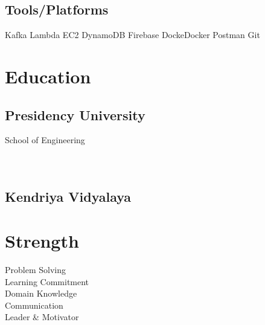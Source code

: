 \documentclass[]{BismayResume}
\begin{document}
\begin{minipage}[t]{0.25\textwidth}
\subsection{Tools/Platforms}
\sectionsep
Kafka \textbullet{}  \textbullet{} Lambda \textbullet{} EC2 \textbullet{}DynamoDB \textbullet{} Firebase \textbullet{} DockeDocker \textbullet{}Postman \textbullet{}Git \\

\sectionsep


\section{Education} 
\subsection{Presidency University}
School of Engineering \\ 

\sectionsep
\\
\\
\subsection{Kendriya Vidyalaya}
\sectionsep


\section{Strength} 

\textbullet{} Problem Solving  \\ \textbullet{} Learning Commitment  \\ \textbullet{} Domain Knowledge \\ \textbullet{} Communication \\ \textbullet{}Leader \& Motivator 






\end{minipage}
\end{document}
